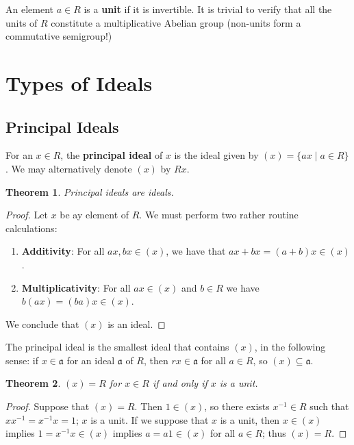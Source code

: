 \documentclass[11pt]{article}
\newtheorem{theorem}{Theorem}
\begin{document}
An element $a \in R$ is a \textbf{unit} if it is invertible. It is trivial to verify that all the units of $R$ constitute a multiplicative Abelian group (non-units form a commutative semigroup!)


\section{Types of Ideals}


\subsection{Principal Ideals}

For an $x \in R$, the \textbf{principal ideal} of $x$ is the ideal given by $(x) = \{ ax \mid a \in R \}$. We may alternatively denote $(x)$ by $Rx$.

\begin{adjustwidth}{0.5cm}{}
	\begin{theorem}
		Principal ideals are ideals.
	\end{theorem}
	\begin{proof}
		Let $x$ be ay element of $R$. We must perform two rather routine calculations:
		\begin{enumerate}
			\item \textbf{Additivity}: For all $ax, bx \in (x)$, we have that $ax + bx = (a + b)x \in (x)$.
			\item \textbf{Multiplicativity}: For all $ax \in (x)$ and $b \in R$ we have $b(ax) = (ba)x \in (x)$.
		\end{enumerate}
		We conclude that $(x)$ is an ideal.
	\end{proof}
\end{adjustwidth}

The principal ideal is the smallest ideal that contains $(x)$, in the following sense: if $x \in \mathfrak{a}$ for an ideal $\mathfrak{a}$ of $R$, then $rx \in \mathfrak{a}$ for all $a \in R$, so $(x) \subseteq \mathfrak{a}$.

\begin{adjustwidth}{0.5cm}{}
	\begin{theorem}
		$(x) = R$ for $x \in R$ if and only if $x$ is a unit.
	\end{theorem}
	\begin{proof}
		Suppose that $(x) = R$. Then $1 \in (x)$, so there exists $x^{-1} \in R$ such that $xx^{-1} = x^{-1}x = 1$; $x$ is a unit. If we suppose that $x$ is a unit, then $x \in (x)$ implies $1 = x^{-1}x \in (x)$ implies $a = a 1 \in (x)$ for all $a \in R$; thus $(x) = R$.
	\end{proof}
\end{adjustwidth}
\end{document}
